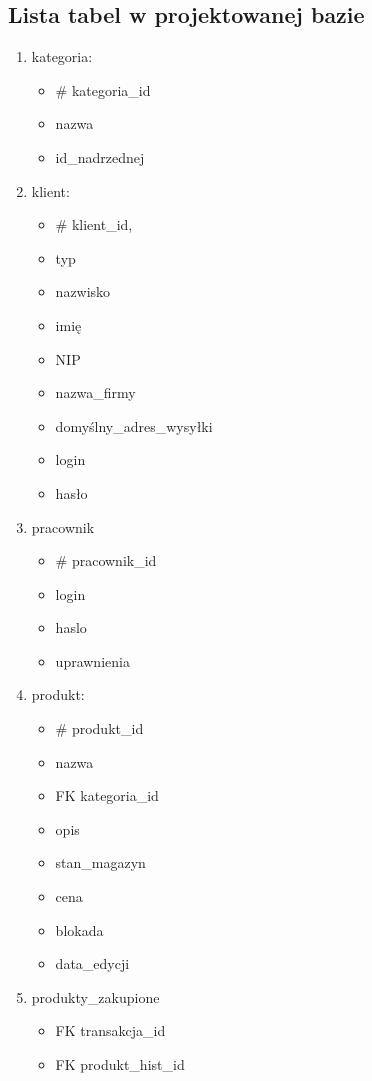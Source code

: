 \subsection{Lista tabel w projektowanej bazie}
\begin{enumerate}
\item kategoria:
\begin{itemize}
	\item \# kategoria\_id 
	\item nazwa 
	\item id\_nadrzednej
\end{itemize}
\item klient:
\begin{itemize}
	\item \# klient\_id,\ 
	\item typ 
	\item nazwisko 
	\item imię 
	\item NIP 
	\item nazwa\_firmy 
	\item domyślny\_adres\_wysyłki 
	\item login 
	\item hasło
	\end{itemize}
\item pracownik
\begin{itemize}
	\item \# pracownik\_id
	\item login
	\item haslo
	\item uprawnienia	
	\end{itemize} 
\item produkt:
\begin{itemize}
	\item \# produkt\_id 
	\item nazwa
	\item FK kategoria\_id 
	\item opis 
	\item stan\_magazyn
	\item cena
	\item blokada
	\item data\_edycji
\end{itemize} 
\item produkty\_zakupione
\begin{itemize}
	\item FK transakcja\_id
	\item FK produkt\_hist\_id
\end{itemize}

\end{enumerate}
